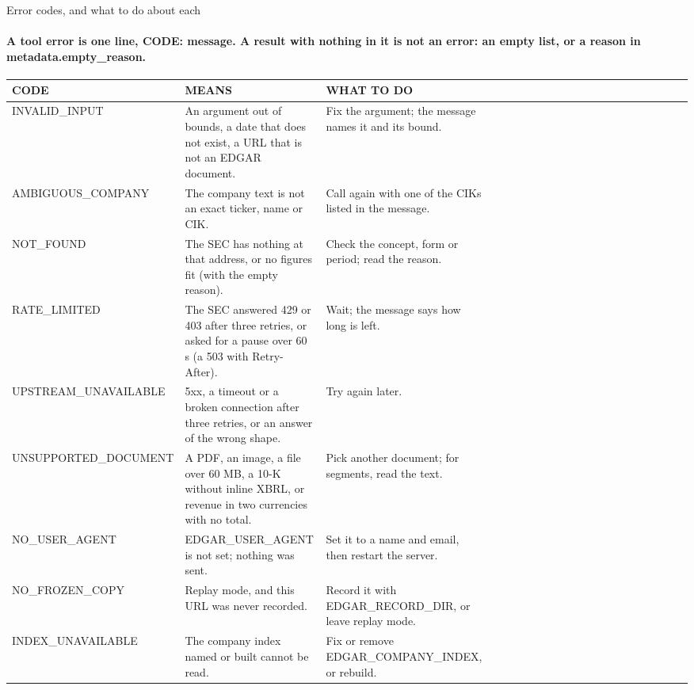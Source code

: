 \documentclass[aspectratio=169,10pt]{beamer}
\newcommand{\kicker}{}
\newcommand{\stcode}{}\newcommand{\stcheck}{}
\newcommand{\status}[2]{\renewcommand{\stcode}{#1}\renewcommand{\stcheck}{#2}}
\newcommand{\cd}[1]{{\ttfamily\fontsize{4.6}{6.15}\selectfont #1}}
\newcommand{\thead}[1]{{\ttfamily\color{muted}\fontsize{5}{6}\selectfont #1}}
\newcommand{\tstart}{\hline\noalign{\vspace{0.8mm}}}
\newcommand{\tmid}{\\[0.4mm]\hline\noalign{\vspace{0.8mm}}}
\newcommand{\tend}{\\[0.4mm]\hline}
\newenvironment{tbl}[1][5.4]{\centering\fontsize{#1}{\numexpr0\relax}\selectfont\fontsize{#1}{1.27\dimexpr#1pt\relax}\selectfont
  \renewcommand{\arraystretch}{1.08}\setlength{\tabcolsep}{1.6mm}}{\par}
\begin{document}
\renewcommand{\kicker}{11 · errors · what the model reads}
\status{\cd{SecError} subclasses in \cd{utils/sec\_client.py}; \cd{\_tool} in \cd{server.py} prefixes each message with its code.}{\cd{test\_cases.py} and \cd{test\_tools\_offline.py} (every code, RATE\_LIMITED offline), \cd{test\_mcp\_stdio.py} (codes over the protocol), \cd{test\_frozen.py} (NO\_FROZEN\_COPY).}
\begin{frame}{Error codes, and what to do about each}
\framesubtitle{A tool error is one line, \cd{CODE: message}. A result with nothing in it is not an error: an empty list, or a reason in \cd{metadata.empty\_reason}.}
\begin{tbl}[5.2]
\begin{tabular}{@{}C{33mm}P{53mm}P{55mm}@{}}
\tstart
\thead{CODE} & \thead{MEANS} & \thead{WHAT TO DO} \tmid
INVALID\_INPUT & An argument out of bounds, a date that does not exist, a URL that is not an EDGAR document. & Fix the argument; the message names it and its bound. \tmid
AMBIGUOUS\_COMPANY & The company text is not an exact ticker, name or CIK. & Call again with one of the CIKs listed in the message. \tmid
NOT\_FOUND & The SEC has nothing at that address, or no figures fit (with the empty reason). & Check the concept, form or period; read the reason. \tmid
RATE\_LIMITED & The SEC answered 429 or 403 after three retries, or asked for a pause over 60 s (a 503 with \cd{Retry-After}). & Wait; the message says how long is left. \tmid
UPSTREAM\_UNAVAILABLE & 5xx, a timeout or a broken connection after three retries, or an answer of the wrong shape. & Try again later. \tmid
UNSUPPORTED\_DOCUMENT & A PDF, an image, a file over 60 MB, a 10-K without inline XBRL, or revenue in two currencies with no total. & Pick another document; for segments, read the text. \tmid
NO\_USER\_AGENT & \cd{EDGAR\_USER\_AGENT} is not set; nothing was sent. & Set it to a name and email, then restart the server. \tmid
NO\_FROZEN\_COPY & Replay mode, and this URL was never recorded. & Record it with \cd{EDGAR\_RECORD\_DIR}, or leave replay mode. \tmid
INDEX\_UNAVAILABLE & The company index named or built cannot be read. & Fix or remove \cd{EDGAR\_COMPANY\_INDEX}, or rebuild. \tend
\end{tabular}
\end{tbl}
\end{frame}
\end{document}
